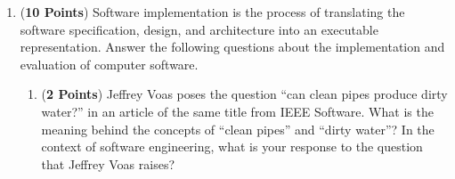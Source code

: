 \documentclass[12pt,epsf,psfig,graphics]{article}
\begin{document}
\begin{enumerate}
\newpage

\item ({\bf 10 Points}) Software implementation is the process of
  translating the software specification, design, and architecture
  into an executable representation.  Answer the following questions
  about the implementation and evaluation of computer software.

\begin{enumerate}









  \item ({\bf 2 Points}) Jeffrey Voas poses the question ``can clean
    pipes produce dirty water?'' in an article of the same title from
    IEEE Software.  What is the meaning behind the concepts of ``clean
    pipes'' and ``dirty water''?  In the context of software
    engineering, what is your response to the question that Jeffrey Voas raises?


\end{enumerate}
\end{enumerate}
\end{document}
